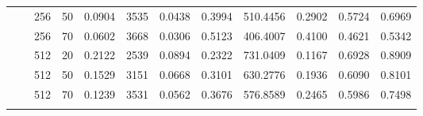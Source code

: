 \begin{table}[H]
{\begin{tabular}{llllrrrrrrrr}
	&  & 256 & 50 & {\cellcolor[HTML]{D6D6F4}} \color[HTML]{000000} 0.0904 & {\cellcolor[HTML]{1515FE}} \color[HTML]{F1F1F1} 3535 & {\cellcolor[HTML]{D2D2F4}} \color[HTML]{000000} 0.0438 & {\cellcolor[HTML]{5252FB}} \color[HTML]{F1F1F1} 0.3994 & {\cellcolor[HTML]{B9B9F6}} \color[HTML]{000000} 510.4456 & {\cellcolor[HTML]{5050FB}} \color[HTML]{F1F1F1} 0.2902 & {\cellcolor[HTML]{A9A9F6}} \color[HTML]{000000} 0.5724 & {\cellcolor[HTML]{9393F8}} \color[HTML]{F1F1F1} 0.6969 \\ & & 256 & 70 & {\cellcolor[HTML]{F0F0F3}} \color[HTML]{000000} 0.0602 & {\cellcolor[HTML]{0000FF}} \color[HTML]{F1F1F1} 3668 & {\cellcolor[HTML]{F0F0F3}} \color[HTML]{000000} 0.0306 & {\cellcolor[HTML]{0000FF}} \color[HTML]{F1F1F1} 0.5123 & {\cellcolor[HTML]{F0F0F3}} \color[HTML]{000000} 406.4007 & {\cellcolor[HTML]{0000FF}} \color[HTML]{F1F1F1} 0.4100 & {\cellcolor[HTML]{F0F0F3}} \color[HTML]{000000} 0.4621 & {\cellcolor[HTML]{F0F0F3}} \color[HTML]{000000} 0.5342 \\ & & 512 & 20 & {\cellcolor[HTML]{6868FA}} \color[HTML]{F1F1F1} 0.2122 & {\cellcolor[HTML]{B4B4F6}} \color[HTML]{000000} 2539 & {\cellcolor[HTML]{6767FA}} \color[HTML]{F1F1F1} 0.0894 & {\cellcolor[HTML]{CCCCF5}} \color[HTML]{000000} 0.2322 & {\cellcolor[HTML]{4343FC}} \color[HTML]{F1F1F1} 731.0409 & {\cellcolor[HTML]{C5C5F5}} \color[HTML]{000000} 0.1167 & {\cellcolor[HTML]{5A5AFA}} \color[HTML]{F1F1F1} 0.6928 & {\cellcolor[HTML]{2424FD}} \color[HTML]{F1F1F1} 0.8909 \\ & & 512 & 50 & {\cellcolor[HTML]{9D9DF7}} \color[HTML]{F1F1F1} 0.1529 & {\cellcolor[HTML]{5252FB}} \color[HTML]{F1F1F1} 3151 & {\cellcolor[HTML]{9D9DF7}} \color[HTML]{F1F1F1} 0.0668 & {\cellcolor[HTML]{9393F8}} \color[HTML]{F1F1F1} 0.3101 & {\cellcolor[HTML]{7979F9}} \color[HTML]{F1F1F1} 630.2776 & {\cellcolor[HTML]{9191F8}} \color[HTML]{F1F1F1} 0.1936 & {\cellcolor[HTML]{9090F8}} \color[HTML]{F1F1F1} 0.6090 & {\cellcolor[HTML]{5252FB}} \color[HTML]{F1F1F1} 0.8101 \\ & & 512 & 70 & {\cellcolor[HTML]{B8B8F6}} \color[HTML]{000000} 0.1239 & {\cellcolor[HTML]{1616FE}} \color[HTML]{F1F1F1} 3531 & {\cellcolor[HTML]{B5B5F6}} \color[HTML]{000000} 0.0562 & {\cellcolor[HTML]{6969FA}} \color[HTML]{F1F1F1} 0.3676 & {\cellcolor[HTML]{9696F7}} \color[HTML]{F1F1F1} 576.8589 & {\cellcolor[HTML]{6D6DF9}} \color[HTML]{F1F1F1} 0.2465 & {\cellcolor[HTML]{9797F7}} \color[HTML]{F1F1F1} 0.5986 & {\cellcolor[HTML]{7575F9}} \color[HTML]{F1F1F1} 0.7498 \\\hlineB{5.5}

\end{tabular}}
\end{table}
